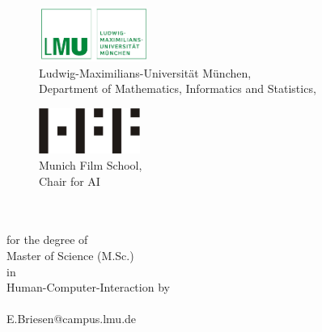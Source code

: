 %


\begin{titlepage}
	\tgherosfont
	
	
	\begin{figure}
	\begin{minipage}[t]{8.5cm}		
	\includegraphics[height=1.8cm,width=3.6cm]{gfx/lmulogo.pdf}\\
	\textsf{\small{
		Ludwig-Maximilians-Universität München, \\	
		Department of Mathematics, Informatics and Statistics, \\
		\thesisUniversityInstitute
	}}
	\end{minipage}
	\hfill
	\begin{minipage}[t]{3.7cm}
	\includegraphics[height=1.5cm]{gfx/hff-logo-small.jpeg}\\
	\textsf{\small{Munich Film School, \\ Chair for AI}}
	\end{minipage}
	\end{figure}
	
	\centering


	\vfill
	{\Large \thesisSubject} \\[5mm]
	{\LARGE \color{ctcolortitle}\textbf{\thesisTitle} \\[10mm]}
	{for the degree of} \\[3mm] 
	{\Large Master of Science (M.Sc.)} \\[3mm]
	{in}\\[3mm]
	{\Large Human-Computer-Interaction}
	\vfill
	{by} \\ [3mm]
	{\Large \thesisName} \\ [3mm]
	{E.Briesen@campus.lmu.de} \\


\end{titlepage}
